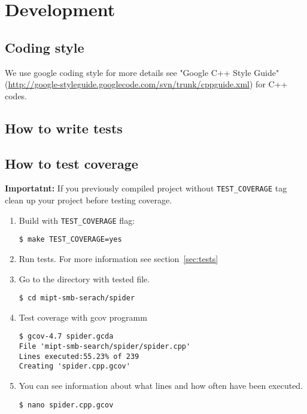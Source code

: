\chapter{Development}

\section{Coding style}

We use google coding style for more details see "Google C++ Style Guide" (\url{http://google-styleguide.googlecode.com/svn/trunk/cppguide.xml}) for C++ codes.

\section{How to write tests}

\section{How to test coverage}

\textbf{Importatnt:} If you previously compiled project without \texttt{TEST\_COVERAGE} tag clean up your project before testing coverage.

\begin{enumerate}

\item Build with \texttt{TEST\_COVERAGE} flag:
\begin{lstlisting}
$ make TEST_COVERAGE=yes
\end{lstlisting}

\item Run tests. For more information see section~\ref{sec:tests}

\item Go to the directory with tested file.
\begin{lstlisting}
$ cd mipt-smb-serach/spider
\end{lstlisting}

\item Test coverage with gcov programm
\begin{lstlisting}
$ gcov-4.7 spider.gcda
File 'mipt-smb-search/spider/spider.cpp'
Lines executed:55.23% of 239
Creating 'spider.cpp.gcov'
\end{lstlisting}

\item You can see information about what lines and how often have been executed.
\begin{lstlisting}
$ nano spider.cpp.gcov
\end{lstlisting}

\end{enumerate}

